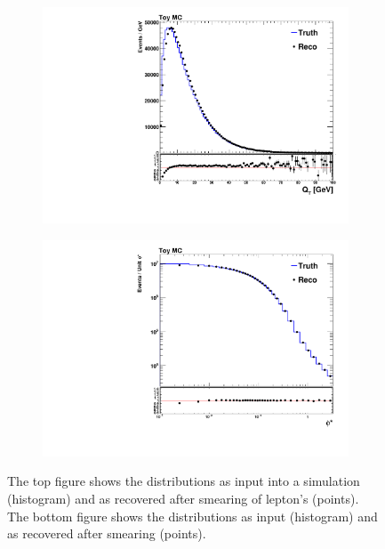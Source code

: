 \begin{figure}[p]
    \centering
    \begin{subfigure}[b]{0.65\textwidth}
        \includegraphics[width=\textwidth]{figures/toy_pt.pdf}
    \end{subfigure}
    \begin{subfigure}[b]{0.65\textwidth}
        \includegraphics[width=\textwidth]{figures/toy_phistar.pdf}
    \end{subfigure}
    \caption[
        Comparison of \bosonpt and \phistar after smearing.
    ]{
        The top figure shows the \bosonpt distributions as input into a
        simulation (histogram) and as recovered after smearing of lepton's \pt
        (points). The bottom figure shows the \phistar distributions as input
        (histogram) and as recovered after smearing (points).
    }
    \label{fig:toy_phistar}
\end{figure}

